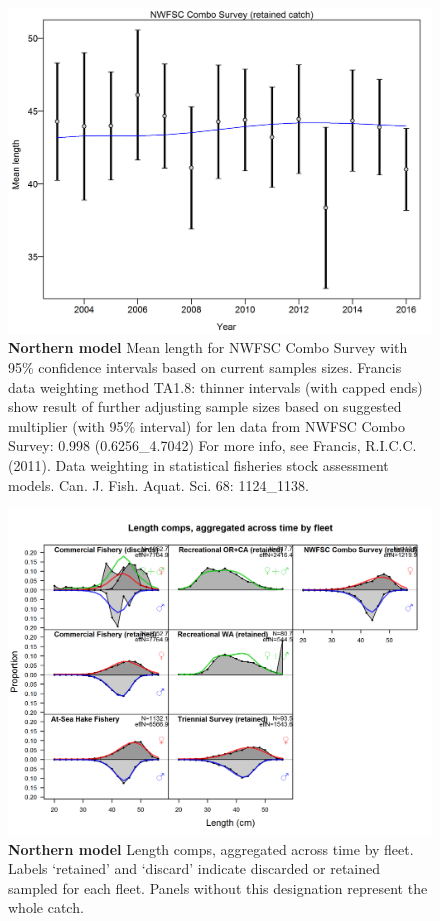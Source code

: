 \documentclass[12pt,]{article}
\begin{document}
\begin{figure}[htbp]
\centering
\includegraphics{./tex2pdf.8516/840d6d4986c0e69a88dcb4cdc3a1630ebc632075.png}
\caption{\textbf{Northern model} Mean length for NWFSC Combo Survey with
95\% confidence intervals based on current samples sizes. Francis data
weighting method TA1.8: thinner intervals (with capped ends) show result
of further adjusting sample sizes based on suggested multiplier (with
95\% interval) for len data from NWFSC Combo Survey: 0.998
(0.6256\_4.7042) For more info, see Francis, R.I.C.C. (2011). Data
weighting in statistical fisheries stock assessment models. Can. J.
Fish. Aquat. Sci. 68: 1124\_1138.
\label{fig:mod1_29_comp_lenfit_data_weighting_TA1.8_NWFSC Combo Survey}}
\end{figure}

\begin{figure}[htbp]
\centering
\includegraphics{./r4ss/plots_mod1/comp_lenfit__aggregated_across_time.png}
\caption{\textbf{Northern model} Length comps, aggregated across time by
fleet. Labels `retained' and `discard' indicate discarded or retained
sampled for each fleet. Panels without this designation represent the
whole catch. \label{fig:mod1_30_comp_lenfit__aggregated_across_time}}
\end{figure}
\end{document}
